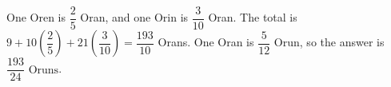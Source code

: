 One Oren is $\dfrac{2}{5}$ Oran, and one Orin is $\dfrac{3}{10}$ Oran. The total is $9+10(\dfrac{2}{5})+21(\dfrac{3}{10})=\dfrac{193}{10}$ Orans. One Oran is $\dfrac{5}{12}$ Orun, so the answer is $\boxed{\dfrac{193}{24}\text{ Oruns}}$.
